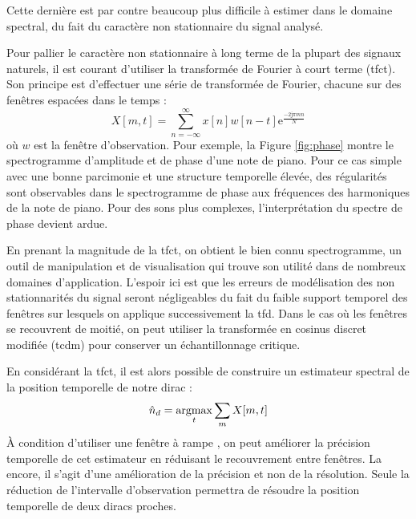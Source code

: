Cette dernière est par contre beaucoup plus difficile à estimer dans le domaine spectral, du fait du caractère non stationnaire du signal analysé.


Pour pallier le caractère non stationnaire à long terme de la plupart des signaux naturels, il est courant d'utiliser la transformée de Fourier à court terme (tfct). Son principe est d'effectuer une série de transformée de Fourier, chacune sur des fenêtres espacées dans le temps :
\begin{equation}
X[m, t] = \sum_{n = - \infty}^{\infty} x[n] w[n-t] \mathrm{e}^{\frac{-2 \mathrm{j}  \pi m n}{N}}
\end{equation}
où $w$ est la fenêtre d'observation. Pour exemple, la Figure \ref{fig:phase} montre le spectrogramme d'amplitude et de phase d'une note de piano. Pour ce cas simple avec une bonne parcimonie et une structure temporelle élevée, des régularités sont observables dans le spectrogramme de phase aux fréquences des harmoniques de la note de piano. Pour des sons plus complexes, l'interprétation du spectre de phase devient ardue.


En prenant la magnitude de la tfct, on obtient le bien connu spectrogramme, un outil de manipulation et de visualisation qui trouve son utilité dans de nombreux domaines d'application. L'espoir ici est que les erreurs de modélisation des non stationnarités du signal seront négligeables du fait du faible support temporel des fenêtres sur lesquels on applique successivement la tfd. Dans le cas où les fenêtres se recouvrent de moitié, on peut utiliser la transformée en cosinus discret modifiée (tcdm) pour conserver un échantillonnage critique.~\cite{princen1986analysis}

En considérant la tfct, il est alors possible de construire un estimateur \og spectral \fg de la position temporelle de notre dirac :
\begin{equation}
\hat{n}_d = \operatorname*{argmax}_t \sum_m X[m, t]
\end{equation}
\`A condition d'utiliser une fenêtre \fg à rampe \og, on peut améliorer la précision temporelle de cet estimateur en réduisant le recouvrement entre fenêtres. La encore, il s'agit d'une amélioration de la précision et non de la résolution. Seule la réduction de l'intervalle d'observation permettra de résoudre la position temporelle de deux diracs proches.

